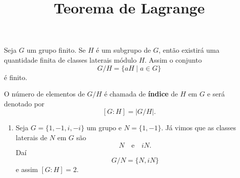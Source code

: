 \documentclass{beamer}
\title{Teorema de Lagrange}
\author[\autor]{\autor}
\institute[\instituto]{\instituto}
\date{}
\begin{document}
    \begin{frame}
        \maketitle
    \end{frame}


    \begin{frame}
        Seja $G$ um grupo finito. Se $H$ é um subgrupo de $G$, então existirá uma quantidade finita de classes laterais módulo $H$.
        Assim o conjunto
        \[
            G/H = \{aH \mid a \in G\}
        \]
        é finito.

        O número de elementos de $G/H$ é chamada de \textbf{índice} de $H$ em $G$ e será denotado por
        \[
            [G : H] = |G/H|.
        \]
    \end{frame}

    \begin{frame}
        \begin{exemplos}
            \begin{enumerate}[label=({\arabic*})]
                \item Seja $G = \{1, -1, i, -i\}$ um grupo \pause e $N = \{1, -1\}$. Já vimos que as classes laterais de $N$ em $G$ são
                \[
                    N \quad \mbox{e}\quad iN.
                \]
                Daí
                \[
                    G/N = \{N, iN\}
                \]
                e assim $[G : H] = 2$.

                \seti
            \end{enumerate}
        \end{exemplos}
    \end{frame}
\end{document}
